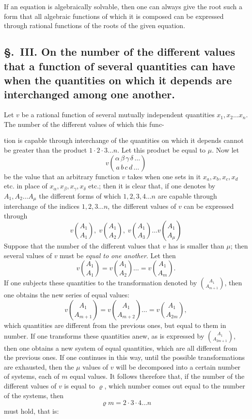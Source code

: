 \documentclass{article}
\begin{document}
If an equation is algebraically solvable, then one can always give the root such a form that all algebraic functions of which it is composed can be expressed through rational functions of the roots of the given equation.

\subsection*{§.~III. On the number of the different values that a function of several quantities can have when the quantities on which it depends are interchanged among one another.}

Let $v$ be a rational function of several mutually independent quantities $x_1, x_2 \ldots x_n$. The number of the different values of which this func-

tion is capable through interchange of the quantities on which it depends cannot be greater than the product $1 \cdot 2 \cdot 3 \ldots n$. Let this product be equal to $\mu$. Now let
\[ v\binom{\alpha\,\beta\,\gamma\,\delta\,\ldots}{a\,b\,c\,d\,\ldots} \]
be the value that an arbitrary function $v$ takes when one sets in it $x_a, x_b, x_c, x_d$ etc. in place of $x_\alpha, x_\beta, x_\gamma, x_\delta$ etc.; then it is clear that, if one denotes by $A_1, A_2 \ldots A_\mu$ the different forms of which $1, 2, 3, 4 \ldots n$ are capable through interchange of the indices $1, 2, 3 \ldots n$, the different values of $v$ can be expressed through
\[ v\binom{A_1}{A_1}, \; v\binom{A_1}{A_2}, \; v\binom{A_1}{A_3} \ldots v\binom{A_1}{A_\mu} \]
Suppose that the number of the different values that $v$ has is smaller than $\mu$; then several values of $v$ must be \emph{equal to one another}. Let then
\[ v\binom{A_1}{A_1} = v\binom{A_1}{A_2} \ldots = v\binom{A_1}{A_m}. \]
If one subjects these quantities to the transformation denoted by $\binom{A_1}{A_{m+1}}$, then one obtains the new series of equal values:
\[ v\binom{A_1}{A_{m+1}} = v\binom{A_1}{A_{m+2}} \ldots = v\binom{A_1}{A_{2m}}, \]
which quantities are different from the previous ones, but equal to them in number. If one transforms these quantities anew, as is expressed by $\binom{A_1}{A_{2m+1}}$, then one obtains a new system of equal quantities, which are all different from the previous ones. If one continues in this way, until the possible transformations are exhausted, then the $\mu$ values of $v$ will be decomposed into a certain number of systems, each of $m$ equal values. It follows therefore that, if the number of the different values of $v$ is equal to $\varrho$, which number comes out equal to the number of the systems, then
\[ \varrho m = 2 \cdot 3 \cdot 4 \ldots n \]
must hold, that is:
\end{document}
